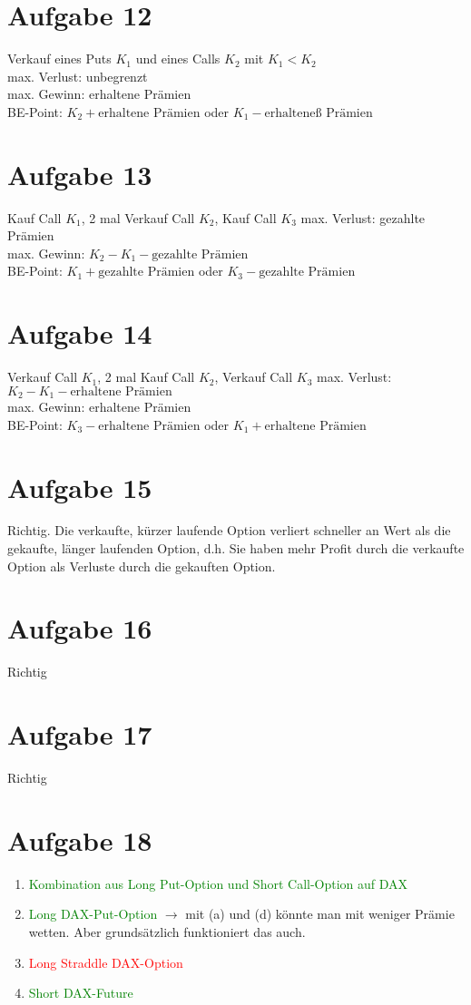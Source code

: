 \documentclass{article}
\begin{document}
	\section*{Aufgabe 12}
	Verkauf eines Puts $K_1$ und eines Calls $K_2$ mit $K_1 < K_2$ \\
	max. Verlust: unbegrenzt \\
	max. Gewinn: erhaltene Prämien \\
	BE-Point: $K_2 + \text{erhaltene Prämien}$ oder $K_1 - \text{erhalteneß Prämien}$
	
	\section*{Aufgabe 13}
	Kauf Call $K_1$, 2 mal Verkauf Call $K_2$, Kauf Call $K_3$
	max. Verlust: gezahlte Prämien \\
	max. Gewinn: $K_2 - K_1 - \text{gezahlte Prämien} $ \\
	BE-Point: $K_1 + \text{gezahlte Prämien}$ oder $K_3 - \text{gezahlte Prämien}$
	
	\section*{Aufgabe 14}
	Verkauf Call $K_1$, 2 mal Kauf Call $K_2$, Verkauf Call $K_3$
	max. Verlust: $K_2 - K_1 - \text{erhaltene Prämien} $ \\
	max. Gewinn:  erhaltene Prämien \\
	BE-Point: $K_3 - \text{erhaltene Prämien}$ oder $K_1 + \text{erhaltene Prämien}$
	
	\section*{Aufgabe 15}
	Richtig. Die verkaufte, kürzer laufende Option verliert schneller an Wert als die gekaufte, länger laufenden Option, d.h. Sie haben mehr Profit durch die verkaufte Option als Verluste durch die gekauften Option.

	\section*{Aufgabe 16}
	Richtig
	
	\section*{Aufgabe 17}
	Richtig
	
	\section*{Aufgabe 18}
	\begin{enumerate}[label=(\alph*)]
		\item\textcolor{green}{Kombination aus Long Put-Option und Short Call-Option auf DAX}
		\item\textcolor{green}{Long DAX-Put-Option} $\to$ mit (a) und (d) könnte man mit weniger Prämie wetten. Aber grundsätzlich funktioniert das auch.
		\item\textcolor{red}{Long Straddle DAX-Option}
		\item\textcolor{green}{Short DAX-Future}
	\end{enumerate}
	
\end{document}
